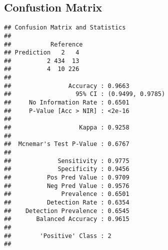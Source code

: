 \documentclass[
]{article}
\newenvironment{Shaded}{\begin{snugshade}}{\end{snugshade}}
\newcommand{\AttributeTok}[1]{\textcolor[rgb]{0.13,0.29,0.53}{#1}}
\newcommand{\DocumentationTok}[1]{\textcolor[rgb]{0.56,0.35,0.01}{\textbf{\textit{#1}}}}
\newcommand{\FunctionTok}[1]{\textcolor[rgb]{0.13,0.29,0.53}{\textbf{#1}}}
\newcommand{\NormalTok}[1]{#1}
\newcommand{\OtherTok}[1]{\textcolor[rgb]{0.56,0.35,0.01}{#1}}
\newcommand{\SpecialCharTok}[1]{\textcolor[rgb]{0.81,0.36,0.00}{\textbf{#1}}}
\newcommand{\StringTok}[1]{\textcolor[rgb]{0.31,0.60,0.02}{#1}}
\begin{document}
\subsection{Confustion Matrix}\label{confustion-matrix}

\begin{Shaded}
\end{Shaded}

\begin{verbatim}
## Confusion Matrix and Statistics
## 
##           Reference
## Prediction   2   4
##          2 434  13
##          4  10 226
##                                           
##                Accuracy : 0.9663          
##                  95% CI : (0.9499, 0.9785)
##     No Information Rate : 0.6501          
##     P-Value [Acc > NIR] : <2e-16          
##                                           
##                   Kappa : 0.9258          
##                                           
##  Mcnemar's Test P-Value : 0.6767          
##                                           
##             Sensitivity : 0.9775          
##             Specificity : 0.9456          
##          Pos Pred Value : 0.9709          
##          Neg Pred Value : 0.9576          
##              Prevalence : 0.6501          
##          Detection Rate : 0.6354          
##    Detection Prevalence : 0.6545          
##       Balanced Accuracy : 0.9615          
##                                           
##        'Positive' Class : 2               
## 
\end{verbatim}
\end{document}

